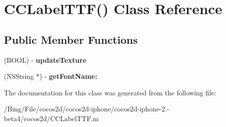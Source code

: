 \hypertarget{interface_c_c_label_t_t_f_07_08}{\section{C\-C\-Label\-T\-T\-F() Class Reference}
\label{interface_c_c_label_t_t_f_07_08}
}
\subsection*{Public Member Functions}
\begin{DoxyCompactItemize}
\item 
\hypertarget{interface_c_c_label_t_t_f_07_08_ad9d88830437201d9badc14eefa09a59d}{(B\-O\-O\-L) -\/ {\bfseries update\-Texture}}\label{interface_c_c_label_t_t_f_07_08_ad9d88830437201d9badc14eefa09a59d}

\item 
\hypertarget{interface_c_c_label_t_t_f_07_08_a3fb6faac54bd4f56687155ad52fb10f8}{(N\-S\-String $\ast$) -\/ {\bfseries get\-Font\-Name\-:}}\label{interface_c_c_label_t_t_f_07_08_a3fb6faac54bd4f56687155ad52fb10f8}

\end{DoxyCompactItemize}


The documentation for this class was generated from the following file\-:\begin{DoxyCompactItemize}
\item 
/\-Bing/\-File/cocos2d/cocos2d-\/iphone/cocos2d-\/iphone-\/2.-\/beta4/cocos2d/C\-C\-Label\-T\-T\-F.\-m\end{DoxyCompactItemize}
